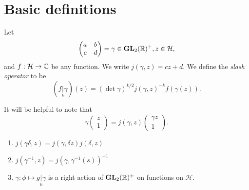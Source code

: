 \documentclass{memoir}
\begin{document}
\section{Basic definitions}
\begin{definition}
    Let 
    \begin{equation}
        \begin{pmatrix}a & b\\ c & d\end{pmatrix} = \gamma \in \mathbf{GL}_2(\mathbb{R})^+, z\in \mathcal H,
    \end{equation}
    and $f:\mathcal H\to \mathbb{C}$ be any function.
    We write $j(\gamma,z) = cz+d$.
    We define the \textit{slash operator} to be
    \begin{equation}
        (f\underset{k}{|} \gamma)(z) = (\det\gamma)^{k/2}j(\gamma,z)^{-k}f(\gamma(z)).
    \end{equation}
\end{definition}
\begin{remark}
    It will be helpful to note that
    \begin{equation}
    \gamma \begin{pmatrix} z \\ 1\end{pmatrix} = j(\gamma,z) \begin{pmatrix} \gamma z \\ 1\end{pmatrix}.
    \end{equation}
\end{remark}
\begin{proposition}
    \begin{enumerate}
        \item $j(\gamma\delta,z) = j(\gamma,\delta z)j(\delta,z)$
        \item $j(\gamma^{-1},z) = j(\gamma,\gamma^{-1}(s))^{-1}$
        \item $\gamma:\phi\mapsto g\underset{k}{|}\gamma$ is a right action of $\mathbf{GL}_2(\mathbb{R})^+$ on functions on $\mathcal H$.
    \end{enumerate}
\end{proposition}
\end{document}
